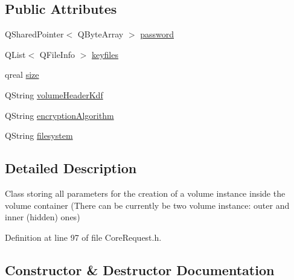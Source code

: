 \subsection*{Public Attributes}
\begin{DoxyCompactItemize}
\item 
Q\+Shared\+Pointer$<$ Q\+Byte\+Array $>$ \hyperlink{struct_gost_crypt_1_1_core_1_1_create_volume_request_1_1_volume_params_a64d08dffe9a5c402eac572fa743ea20b}{password}
\item 
Q\+List$<$ Q\+File\+Info $>$ \hyperlink{struct_gost_crypt_1_1_core_1_1_create_volume_request_1_1_volume_params_a0db0886fa69cbd803e96f0644b51416a}{keyfiles}
\item 
qreal \hyperlink{struct_gost_crypt_1_1_core_1_1_create_volume_request_1_1_volume_params_a806801db6b7adc9a04579ec6f0b57812}{size}
\item 
Q\+String \hyperlink{struct_gost_crypt_1_1_core_1_1_create_volume_request_1_1_volume_params_ac1333e405430c8c6f73550975b9530ab}{volume\+Header\+Kdf}
\item 
Q\+String \hyperlink{struct_gost_crypt_1_1_core_1_1_create_volume_request_1_1_volume_params_a444833f5dd741eeb2a81ae6014f4c98b}{encryption\+Algorithm}
\item 
Q\+String \hyperlink{struct_gost_crypt_1_1_core_1_1_create_volume_request_1_1_volume_params_a115fb5eabbbadfeecce444182b49c8d8}{filesystem}
\end{DoxyCompactItemize}


\subsection{Detailed Description}
Class storing all parameters for the creation of a volume instance inside the volume container (There can be currently be two volume instance\+: outer and inner (hidden) ones) 

Definition at line 97 of file Core\+Request.\+h.



\subsection{Constructor \& Destructor Documentation}
\mbox{\label{struct_gost_crypt_1_1_core_1_1_create_volume_request_1_1_volume_params_a83f6db640ad58de631f17d25f07228a3}} 
